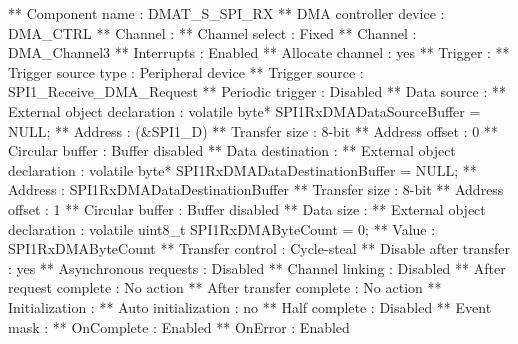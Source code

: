 \begin{DoxyCode}
**          Component name                                 : DMAT\_S\_SPI\_RX
**          DMA controller device                          : DMA\_CTRL
**          Channel                                        : 
**            Channel select                               : Fixed
**              Channel                                    : DMA\_Channel3
**              Interrupts                                 : Enabled
**              Allocate channel                           : yes
**          Trigger                                        : 
**            Trigger source type                          : Peripheral device
**              Trigger source                             : SPI1\_Receive\_DMA\_Request
**              Periodic trigger                           : Disabled
**          Data source                                    : 
**            External \textcolor{keywordtype}{object} declaration                  : \textcolor{keyword}{volatile} byte* SPI1RxDMADataSourceBuffer = 
      NULL;
**            Address                                      : (&SPI1\_D)
**            Transfer size                                : 8-bit
**            Address offset                               : 0
**            Circular buffer                              : Buffer disabled
**          Data destination                               : 
**            External \textcolor{keywordtype}{object} declaration                  : \textcolor{keyword}{volatile} byte* SPI1RxDMADataDestinationBuffer 
      = NULL;
**            Address                                      : SPI1RxDMADataDestinationBuffer
**            Transfer size                                : 8-bit
**            Address offset                               : 1
**            Circular buffer                              : Buffer disabled
**          Data size                                      : 
**            External \textcolor{keywordtype}{object} declaration                  : \textcolor{keyword}{volatile} uint8\_t SPI1RxDMAByteCount = 0;
**            Value                                        : SPI1RxDMAByteCount
**          Transfer control                               : Cycle-steal
**            Disable after transfer                       : yes
**            Asynchronous requests                        : Disabled
**            Channel linking                              : Disabled
**            After request complete                       : No action
**            After transfer complete                      : No action
**          Initialization                                 : 
**            Auto initialization                          : no
**            Half complete                                : Disabled
**            Event mask                                   : 
**              OnComplete                                 : Enabled
**              OnError                                    : Enabled
\end{DoxyCode}
